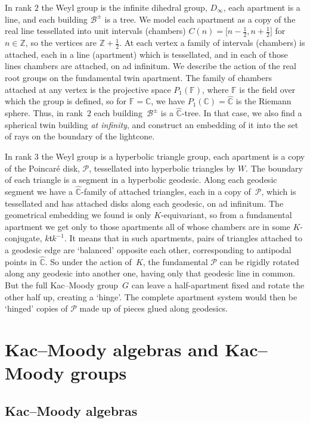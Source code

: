 \documentclass[pdftex]{sigma}
\numberwithin{equation}{section}
\def\C{{\mathbb C}}
\def\F{{\mathbb F}}
\def\Z{\mathbb{Z}}
\def\cB{\mathcal B}
\def\cP{\mathcal P}
\def\ft{\mathfrak{t}}
\begin{document}
In rank $2$ the Weyl group is the infinite dihedral group, $D_\infty$, each apartment is a line, and each building $\cB^\pm$ is a tree. We model each apartment as a copy of the real line tessellated into unit intervals (chambers)
$C(n) = \big[n-\frac{1}{2},n+\frac{1}{2}\big]$ for $n\in\Z$, so the vertices are $\Z+\frac{1}{2}$.
At each vertex a family of intervals (chambers) is attached, each in a line (apartment) which is tessellated, and in each of those lines chambers are attached, on ad infinitum. We describe the action of the real root groups on the fundamental twin apartment. The family of chambers attached at any vertex is the projective space $P_1(\F)$, where $\F$ is the field over which the group is defined, so for $\F = \C$, we have $P_1(\C) = \hat\C$ is the Riemann sphere. Thus, in rank~$2$ each building~$\cB^\pm$ is a $\hat\C$-tree.
In that case, we also find a spherical twin building {\it at infinity}, and construct an embedding of it into the set of rays on the boundary of the lightcone.

In rank $3$ the Weyl group is a hyperbolic triangle group, each apartment is a copy of the Poincar\'e disk, $\cP$, tessellated into hyperbolic triangles by $W$. The boundary of each triangle is a segment in a hyperbolic geodesic. Along each geodesic segment we
have a $\hat\C$-family of attached triangles, each in a copy of~$\cP$, which is tessellated and has attached disks along each
geodesic, on ad infinitum. The geometrical embedding we found is only $K$-equivariant, so from a fundamental apartment we get only
to those apartments all of whose chambers are in some $K$-conjugate, $k\ft k^{-1}$. It means that in such apartments, pairs of triangles
attached to a geodesic edge are `balanced' opposite each other, corresponding to antipodal points in $\hat\C$. So under the action of~$K$, the fundamental $\cP$ can be rigidly rotated along any geodesic into another one, having only that geodesic line in common.
But the full Kac--Moody group~$G$ can leave a half-apartment fixed and rotate the other half up, creating a `hinge'. The complete apartment system would then be `hinged' copies of $\cP$ made up of pieces glued along geodesics.

\section{Kac--Moody algebras and Kac--Moody groups}

\subsection{Kac--Moody algebras}\label{subsection:Kac--Moody-algebra}
\end{document}

